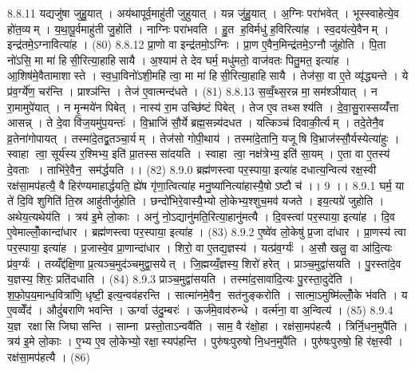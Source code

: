 8.8.11
यद्यजु॑षा जुहु॒यात् । अय॑थापूर्व॒माहु॑ती जुहुयात् । यन्न जु॑हु॒यात् । अ॒ग्निः परा॑भवेत् । भूस्स्वाहेत्ये॒व हो॑त॒व्यम् । य॒था॒पू॒र्वमाहु॑ती जु॒होति॑ । नाग्निः परा॑भवति । हु॒त ह॒विर्मधु॑ ह॒विरित्या॑ह । स्व॒दय॑त्ये॒वैनम् । इन्द्र॑तमे॒ऽग्नावित्या॑ह । (80)
8.8.12
प्रा॒णो वा इन्द्र॑तमो॒ऽग्निः । प्रा॒ण ए॒वैन॒मिन्द्र॑तमे॒ऽग्नौ जु॑होति । पि॒ता नो॑ऽसि॒ मा मा॑ हिसी॒रित्या॒हाहि॑सायै । अ॒श्याम॑ ते देव घर्म॒ मधु॑मतो॒ वाज॑वतः पितु॒मत॒ इत्या॑ह । आ॒शिष॑मे॒वैतामाशास्ते । स्व॒धा॒विनो॑ऽशी॒महि॑ त्वा॒ मा मा॑ हिसी॒रित्या॒हाहि॑सायै । तेज॑सा॒ वा ए॒ते व्यृ॑द्ध्यन्ते । ये प्र॑व॒र्ग्ये॑ण॒ चर॑न्ति । प्राश्ञ॑न्ति । तेज॑ ए॒वात्मन्द॑धते । (81)
8.8.13
स॒व्वँ॒थ्स॒रन्न मा॒॒सम॑श्ञीयात् । न रा॒मामुपे॑यात् । न मृ॒न्मये॑न पिबेत् । नास्य॑ रा॒म उच्छि॑ष्टं पिबेत् । तेज ए॒व तथ्सश्य॑ति । दे॒वा॒सु॒रास्सय्यँ॑त्ता आसन्न् । ते दे॒वा वि॑ज॒यमु॑प॒यन्तः॑ । वि॒भ्राजि॑ सौ॒र्ये ब्रह्म॒सन्न्य॑दधत । यत्किञ्च॑ दिवाकी॒र्त्यम् । तदे॒तेनै॒व व्र॒तेना॑गोपायत् । तस्मा॑दे॒तद्व्र॒तञ्चा॒र्यम् । तेज॑सो गोपी॒थाय॑ । तस्मा॑दे॒तानि॒ यजू॑षि वि॒भ्राज॑स्सौ॒र्यस्येत्या॑हुः । स्वाहा त्वा॒ सूर्य॑स्य र॒श्मिभ्य॒ इति॑ प्रा॒तस्ससा॑दयति । स्वाहा त्वा॒ नक्ष॑त्रेभ्य॒ इति॑ सा॒यम् । ए॒ता वा ए॒तस्य॑ दे॒वताः । ताभि॑रे॒वैन॒॒ सम॑र्द्धयति ।। (82)
8.9.0
ब्रह्म॑णस्त्वा पर॒स्पाया॒ इत्या॑ह दधात्य॒न्वित्य॑ रक्ष॒स्वी रक्ष॑सा॒मप॑हत्यै॒ वै हिर॑ण्यमाहार्द्धयति॒ ह्ये॑ष गृ॑णा॒त्वित्या॑ह मनु॒ष्या॑नित्या॑हास्यै॒षोऽष्टौ च॑ ।। 9 ।।
8.9.1
घर्म॒ या ते॑ दि॒वि शुगिति॑ ति॒स्र आहु॑तीर्जुहोति । छन्दो॑भिरे॒वास्यै॒भ्यो लो॒केभ्य॒श्शुच॒मव॑ यजते । इय॒त्यग्रे॑ जुहोति । अथेय॒त्यथेय॑ति । त्रय॑ इ॒मे लो॒काः । अनु॑ नो॒ऽद्यानु॑मति॒रित्या॒हानु॑मत्यै । दि॒वस्त्वा॑ पर॒स्पाया॒ इत्या॑ह । दि॒व ए॒वेमाल्लोँ॒कान्दा॑धार । ब्रह्म॑णस्त्वा पर॒स्पाया॒ इत्या॑ह । (83)
8.9.2
ए॒ष्वे॑व लो॒केषु॑ प्र॒जा दा॑धार । प्रा॒णस्य॑ त्वा पर॒स्पाया॒ इत्या॑ह । प्र॒जास्वे॒व प्रा॒णान्दा॑धार । शिरो॒ वा ए॒तद्य॒ज्ञस्य॑ । यत्प्र॑व॒र्ग्यः॑ । अ॒सौ खलु॒ वा आ॑दि॒त्यः प्र॑व॒र्ग्यः॑ । तय्यँद्द॑क्षि॒णा प्र॒त्यञ्च॒मुद॑ञ्चमुद्वा॒सयेत् । जि॒ह्मय्यँ॒ज्ञस्य॒ शिरो॑ हरेत् । प्राञ्च॒मुद्वा॑सयति । पु॒रस्ता॑दे॒व य॒ज्ञस्य॒ शिरः॒ प्रति॑दधाति । (84)
8.9.3
प्राञ्च॒मुद्वा॑सयति । तस्मा॑द॒सावा॑दि॒त्यः पु॒रस्ता॒दुदे॑ति । श॒फो॒प॒य॒मान्ध॒वित्रा॑णि॒ धृष्टी॒ इत्य॒न्वव॑हरन्ति । सात्मा॑नमे॒वैन॒॒ सत॑नुङ्करोति । सात्मा॒ऽमुष्मि॑ल्लोँ॒के भ॑वति । य ए॒वव्वेँद॑ । औदुं॑बराणि भवन्ति । ऊर्ग्वा उ॑दु॒म्बरः॑ । ऊर्ज॑मे॒वाव॑रुन्धे । वर्त्म॑ना॒ वा अ॒न्वित्य॑ । (85)
8.9.4
य॒ज्ञ रक्षा॑सि जिघासन्ति । साम्ना प्रस्तो॒ताऽन्ववै॑ति । साम॒ वै र॑क्षो॒हा । रक्ष॑सा॒मप॑हत्यै । त्रिर्नि॒धन॒मुपै॑ति । त्रय॑ इ॒मे लो॒काः । ए॒भ्य ए॒व लो॒केभ्यो॒ रक्षा॒॒स्यप॑हन्ति । पुरु॑षःपुरुषो नि॒धन॒मुपै॑ति । पुरु॑षःपुरुषो॒ हि र॑क्ष॒स्वी । रक्ष॑सा॒मप॑हत्यै । (86)
